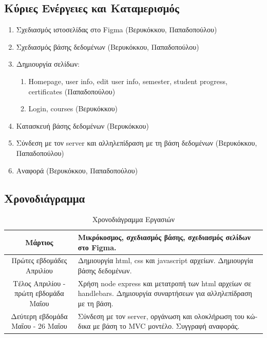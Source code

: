 \documentclass[manuscript,screen,review]{acmart}
\newcommand{\gr}[1]{\foreignlanguage{greek}{#1}}
\begin{document}
\subsection{\gr{Κύριες Ενέργειες και Καταμερισμός}}
\begin{enumerate}
    \item \gr{Σχεδιασμός ιστοσελίδας στο} Figma \gr{(Βερυκόκκου, Παπαδοπούλου)}
    \item \gr{Σχεδιασμός βάσης δεδομένων (Βερυκόκκου, Παπαδοπούλου)}
    \item \gr{Δημιουργία σελίδων:}
    \begin{enumerate}
        \item Homepage, user info, edit user info, semester, student progress, certificates \gr{(Παπαδοπούλου)}
        \item Login, courses \gr{(Βερυκόκκου)}
    \end{enumerate}
    \item \gr{Κατασκευή βάσης δεδομένων (Βερυκόκκου)}
    \item \gr{Σύνδεση με τον} server \gr{και αλληλεπίδραση με τη βάση δεδομένων (Βερυκόκκου, Παπαδοπούλου)}
    \item \gr{Αναφορά (Βερυκόκκου, Παπαδοπούλου)}
\end{enumerate}

\subsection{\gr{Χρονοδιάγραμμα}}

\begin{table}[H]
\centering
\begin{tabular}{|c|p{8cm}|}
\hline
\gr{Μάρτιος} & \gr{Μικρόκοσμος, σχεδιασμός βάσης, σχεδιασμός σελίδων στο} Figma. \\
\hline
\gr{Πρώτες εβδομάδες Απριλίου} & \gr{Δημιουργία} html, css  \gr{και} javascript \gr{αρχείων. Δημιουργία βάσης δεδομένων.} \\
\hline
\gr{Τέλος Απριλίου - πρώτη εβδομάδα Μαΐου} & \gr{Χρήση} node express \gr{και μετατροπή των} html \gr{αρχείων σε} handlebars. \gr{Δημιουργία συναρτήσεων για αλληλεπίδραση με τη βάση.} \\
\hline
\gr{Δεύτερη εβδομάδα Μαΐου - 26 Μαΐου} & \gr{Σύνδεση με τον} server, \gr{οργάνωση και ολοκλήρωση του κώδικα με βάση το} MVC \gr{μοντέλο. Συγγραφή αναφοράς.} \\
\hline
\end{tabular}
\caption{\gr{Χρονοδιάγραμμα Εργασιών}}
\label{table:timeline}
\end{table}
\end{document}
